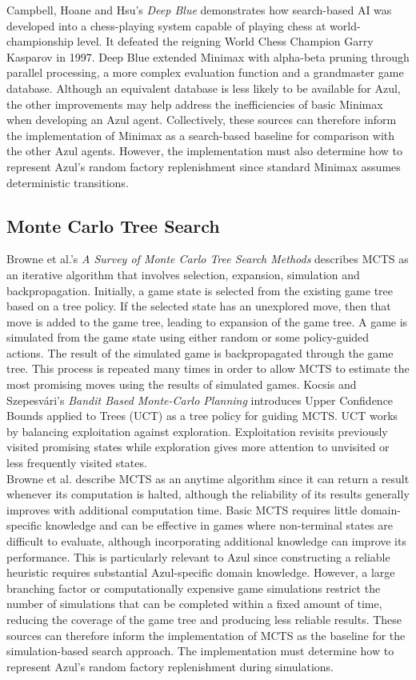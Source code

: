 Campbell, Hoane and Hsu's \emph{Deep Blue} \cite{deepblue} demonstrates how search-based AI was developed into a chess-playing system capable of playing chess at world-championship level. It defeated the reigning World Chess Champion Garry Kasparov in 1997. Deep Blue extended Minimax with alpha-beta pruning through parallel processing, a more complex evaluation function and a grandmaster game database. Although an equivalent database is less likely to be available for Azul, the other improvements may help address the inefficiencies of basic Minimax when developing an Azul agent. Collectively, these sources can therefore inform the implementation of Minimax as a search-based baseline for comparison with the other Azul agents. However, the implementation must also determine how to represent Azul's random factory replenishment since standard Minimax assumes deterministic transitions.


\subsection{Monte Carlo Tree Search}
Browne et al.'s \emph{A Survey of Monte Carlo Tree Search Methods} \cite{mctshistory} describes MCTS as an iterative algorithm that involves selection, expansion, simulation and backpropagation. Initially, a game state is selected from the existing game tree based on a tree policy. If the selected state has an unexplored move, then that move is added to the game tree, leading to expansion of the game tree. A game is simulated from the game state using either random or some policy-guided actions. The result of the simulated game is backpropagated through the game tree. This process is repeated many times in order to allow MCTS to estimate the most promising moves using the results of simulated games. Kocsis and Szepesvári's \emph{Bandit Based Monte-Carlo Planning} \cite{mctsutc} introduces Upper Confidence Bounds applied to Trees (UCT) as a tree policy for guiding MCTS. UCT works by balancing exploitation against exploration. Exploitation revisits previously visited promising states while exploration gives more attention to unvisited or less frequently visited states. \\

Browne et al. \cite{mctshistory} describe MCTS as an anytime algorithm since it can return a result whenever its computation is halted, although the reliability of its results generally improves with additional computation time. Basic MCTS requires little domain-specific knowledge and can be effective in games where non-terminal states are difficult to evaluate, although incorporating additional knowledge can improve its performance. This is particularly relevant to Azul since constructing a reliable heuristic requires substantial Azul-specific domain knowledge. However, a large branching factor or computationally expensive game simulations restrict the number of simulations that can be completed within a fixed amount of time, reducing the coverage of the game tree and producing less reliable results. These sources can therefore inform the implementation of MCTS as the baseline for the simulation-based search approach. The implementation must determine how to represent Azul's random factory replenishment during simulations. 


